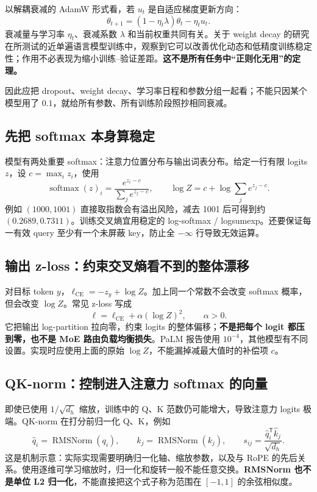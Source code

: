 \documentclass[UTF8,fontset=fandol,zihao=-4,a4paper]{ctexart}
\newcommand{\nextpage}{\clearpage}
\begin{document}
以解耦衰减的 AdamW 形式看，若 $u_t$ 是自适应梯度更新方向：
\[
\theta_{t+1}=(1-\eta_t\lambda)\theta_t-\eta_tu_t.
\]
衰减量与学习率 $\eta_t$、衰减系数 $\lambda$ 和当前权重共同有关。关于 weight decay 的研究在所测试的近单遍语言模型训练中，观察到它可以改善优化动态和低精度训练稳定性；作用不必表现为缩小训练--验证差距。\textbf{这不是所有任务中“正则化无用”的定理。}

因此应把 dropout、weight decay、学习率日程和参数分组一起看；不能只因某个模型用了 $0.1$，就给所有参数、所有训练阶段照抄相同衰减。

\subsection{先把 softmax 本身算稳定}
模型有两处重要 softmax：注意力位置分布与输出词表分布。给定一行有限 logits $z$，设 $c=\max_i z_i$，使用
\[
\operatorname{softmax}(z)_i=\frac{e^{z_i-c}}{\sum_j e^{z_j-c}},\qquad
\log Z=c+\log\sum_j e^{z_j-c}.
\]
例如 $(1000,1001)$ 直接取指数会有溢出风险，减去 1001 后可得到约 $(0.2689,0.7311)$。训练交叉熵宜用稳定的 log-softmax / logsumexp。还要保证每一有效 query 至少有一个未屏蔽 key，防止全 $-\infty$ 行导致无效运算。

\subsection{输出 z-loss：约束交叉熵看不到的整体漂移}
对目标 token $y$，$\ell_{\mathrm{CE}}=-z_y+\log Z$。加上同一个常数不会改变 softmax 概率，但会改变 $\log Z$。常见 z-loss 写成
\[
\ell=\ell_{\mathrm{CE}}+\alpha(\log Z)^2,\qquad\alpha>0.
\]
它把输出 log-partition 拉向零，约束 logits 的整体偏移；\textbf{不是把每个 logit 都压到零，也不是 MoE 路由负载均衡损失}。PaLM 报告使用 $10^{-4}$，其他模型有不同设置。实现时应使用上面的原始 $\log Z$，不能漏掉减最大值时的补偿项 $c$。

\nextpage
\subsection{QK-norm：控制进入注意力 softmax 的向量}
即使已使用 $1/\sqrt{d_h}$ 缩放，训练中的 Q、K 范数仍可能增大，导致注意力 logits 极端。QK-norm 在打分前归一化 Q、K，例如
\[
\widehat q_i=\operatorname{RMSNorm}(q_i),\qquad
\widehat k_j=\operatorname{RMSNorm}(k_j),\qquad
s_{ij}=\frac{\widehat q_i^{\mathsf T}\widehat k_j}{\sqrt{d_h}}.
\]
这是机制示意：实际实现需要明确归一化轴、缩放参数，以及与 RoPE 的先后关系。使用逐维可学习缩放时，归一化和旋转一般不能任意交换。\textbf{RMSNorm 也不是单位 L2 归一化}，不能直接把这个式子称为范围在 $[-1,1]$ 的余弦相似度。
\end{document}
